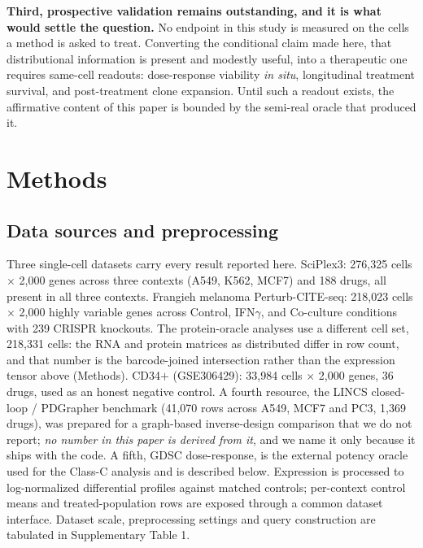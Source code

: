 \documentclass[11pt,letterpaper]{article}
\begin{document}
\textbf{Third, prospective validation remains outstanding, and it is what would settle the
question.} No endpoint in this study is measured on the cells a method is asked to treat.
Converting the conditional claim made here, that distributional information is present and modestly
useful, into a therapeutic one requires same-cell readouts: dose-response viability \emph{in situ},
longitudinal treatment survival, and post-treatment clone expansion. Until such a readout exists,
the affirmative content of this paper is bounded by the semi-real oracle that produced it.

\section*{Methods}

\subsection*{Data sources and preprocessing}

Three single-cell datasets carry every result reported here. SciPlex3\cite{dataSciPlex3}: 276,325 cells $\times$ 2,000 genes across three contexts (A549, K562, MCF7) and 188
drugs, all present in all three contexts. Frangieh melanoma Perturb-CITE-seq\cite{dataFrangieh}: 218,023 cells $\times$ 2,000 highly variable genes across Control,
IFN$\gamma$, and Co-culture conditions with 239 CRISPR knockouts. The protein-oracle analyses use a different cell set, 218,331 cells: the RNA and protein matrices as distributed differ in row count, and that number is the barcode-joined intersection rather than the expression tensor above (Methods). CD34$+$
(GSE306429)\cite{dataCD34}: 33,984 cells $\times$ 2,000 genes, 36 drugs, used as an honest negative
control. A fourth resource, the LINCS closed-loop / PDGrapher benchmark (41,070 rows
across A549, MCF7 and PC3, 1,369 drugs), was prepared for a graph-based inverse-design comparison
that we do not report; \emph{no number in this paper is derived from it}, and we name it only
because it ships with the code. A fifth, GDSC dose-response, is the external potency oracle used
for the Class-C analysis and is described below. Expression is processed to log-normalized
differential profiles against matched controls; per-context control means and treated-population
rows are exposed through a common dataset interface. Dataset scale, preprocessing settings and query
construction are tabulated in Supplementary Table 1.
\end{document}
